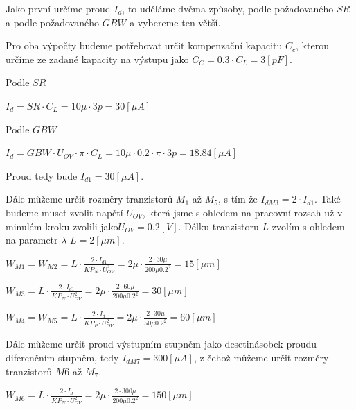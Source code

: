 Jako první určíme proud \(I_d\), to uděláme dvěma způsoby, podle požadovaného \(SR\) a podle požadovaného \(GBW\) a vybereme ten větší.

Pro oba výpočty budeme potřebovat určit kompenzační kapacitu \(C_c\), kterou určíme ze zadané kapacity na výstupu jako \(C_C = 0.3 \cdot C_L = 3 [pF]\).

Podle \(SR\)
\begin{center}
    \large
    \(
        I_d = SR \cdot C_L = 10\mu \cdot 3p = 30 [\mu A]
    \)
\end{center}

Podle \(GBW\) 
\begin{center}
    \large
    \(
        I_d = GBW \cdot U_{OV} \cdot \pi \cdot C_L = 10\mu \cdot 0.2 \cdot \pi \cdot 3p =  18.84 [\mu A]
    \)
\end{center}

Proud tedy bude \(I_{d1} = 30 [\mu A]\).

Dále můžeme určit rozměry tranzistorů \(M_1\) až \(M_5\), s tím že \(I_{dM3} = 2 \cdot I_{d1} \).
Také budeme muset zvolit napětí \(U_{OV}\), která jsme s ohledem na pracovní rozsah už v minulém kroku zvolili jako\(U_{OV} = 0.2 [V]\).
Délku tranzistoru \(L\) zvolím s ohledem na parametr \(\lambda\) \(L = 2 [\mu m]\).

\begin{center}
    \large
    \(
        W_{M1} = W_{M2} = L \cdot \frac{2 \cdot I_{d1}}{KP_N \cdot U_{OV}^2} = 2\mu \cdot \frac{2 \cdot 30\mu}{200\mu 0.2^2} = 15 [\mu m]
    \)
\end{center}

\begin{center}
    \large
    \(
        W_{M3} = L \cdot \frac{2 \cdot I_{d1}}{KP_N \cdot U_{OV}^2} = 2\mu \cdot \frac{2 \cdot 60\mu}{200\mu 0.2^2} = 30 [\mu m]
    \)
\end{center}

\begin{center}
    \large
    \(
        W_{M4} = W_{M5} = L \cdot \frac{2 \cdot I_d}{KP_P \cdot U_{OV}^2} = 2\mu \cdot \frac{2 \cdot 30\mu}{50\mu 0.2^2} = 60 [\mu m]
    \)
\end{center}

Dále můžeme určit proud výstupním stupněm jako desetinásobek proudu diferenčním stupněm, tedy \(I_{dM7} = 300 [\mu A]\), z čehož můžeme určit rozměry tranzistorů \(M6\) až \(M_7\).

\begin{center}
    \large
    \(
        W_{M6} = L \cdot \frac{2 \cdot I_d}{KP_N \cdot U_{OV}^2} = 2\mu \cdot \frac{2 \cdot 300\mu}{200\mu 0.2^2} = 150 [\mu m]
    \)
\end{center}

